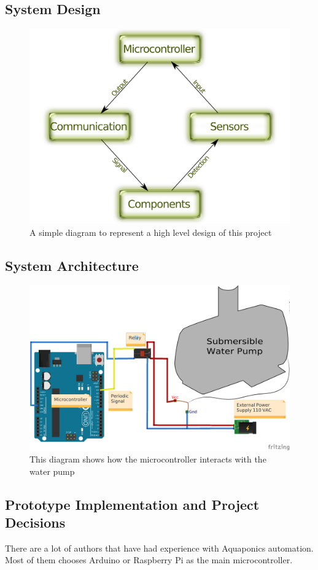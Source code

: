 \subsection{System Design}

\begin{figure}[h]
    \centering
    \includegraphics[width=.8\linewidth]{diagrams/systemDesign}
    \caption{A simple diagram to represent a high level design of this project}
    \label{fig:highLevelSystemDesign}
\end{figure}

\subsection{System Architecture}

\begin{figure}[h]
    \centering
    \includegraphics[width=.8\linewidth]{diagrams/architecture_bb}
    \caption{This diagram shows how the microcontroller interacts with the water pump}
    \label{fig:waterCycleDiagram}
\end{figure}

\subsection{Prototype Implementation and Project Decisions}
There are a lot of authors that have had experience with Aquaponics automation.
Most of them chooses Arduino or Raspberry Pi as the main microcontroller.

